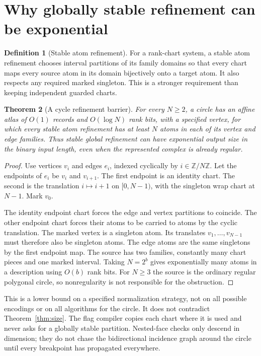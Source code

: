\documentclass[11pt]{article}
\newtheorem{theorem}{Theorem}[section]
\theoremstyle{definition}\newtheorem{definition}[theorem]{Definition}
\theoremstyle{remark}\newtheorem{remark}[theorem]{Remark}
\newcommand{\Z}{\mathbb Z}
\begin{document}
\section{Why globally stable refinement can be exponential}
\label{sec:barrier}

\begin{definition}[Stable atom refinement]
For a rank-chart system, a stable atom refinement chooses interval partitions of its family domains so that every chart maps every source atom in its domain bijectively onto a target atom. It also respects any required marked singleton. This is a stronger requirement than keeping independent guarded charts.
\end{definition}

\begin{theorem}[A cycle refinement barrier]\label{thm:barrier}
For every \(N\geq2\), a circle has an affine atlas of \(O(1)\) records and \(O(\log N)\) rank bits, with a specified vertex, for which every stable atom refinement has at least \(N\) atoms in each of its vertex and edge families. Thus stable global refinement can have exponential output size in the binary input length, even when the represented complex is already regular.
\end{theorem}
\begin{proof}
Use vertices \(v_i\) and edges \(e_i\), indexed cyclically by \(i\in\Z/N\Z\). Let the endpoints of \(e_i\) be \(v_i\) and \(v_{i+1}\). The first endpoint is an identity chart. The second is the translation \(i\mapsto i+1\) on \([0,N-1)\), with the singleton wrap chart at \(N-1\). Mark \(v_0\).

The identity endpoint chart forces the edge and vertex partitions to coincide. The other endpoint chart forces their atoms to be carried to atoms by the cyclic translation. The marked vertex is a singleton atom. Its translates \(v_1,\ldots,v_{N-1}\) must therefore also be singleton atoms. The edge atoms are the same singletons by the first endpoint map. The source has two families, constantly many chart pieces and one marked interval. Taking \(N=2^b\) gives exponentially many atoms in a description using \(O(b)\) rank bits. For \(N\geq3\) the source is the ordinary regular polygonal circle, so nonregularity is not responsible for the obstruction.
\end{proof}

This is a lower bound on a specified normalization strategy, not on all possible encodings or on all algorithms for the circle. It does not contradict Theorem~\ref{thm:size}. The flag compiler copies each chart where it is used and never asks for a globally stable partition. Nested-face checks only descend in dimension; they do not chase the bidirectional incidence graph around the circle until every breakpoint has propagated everywhere.
\end{document}
